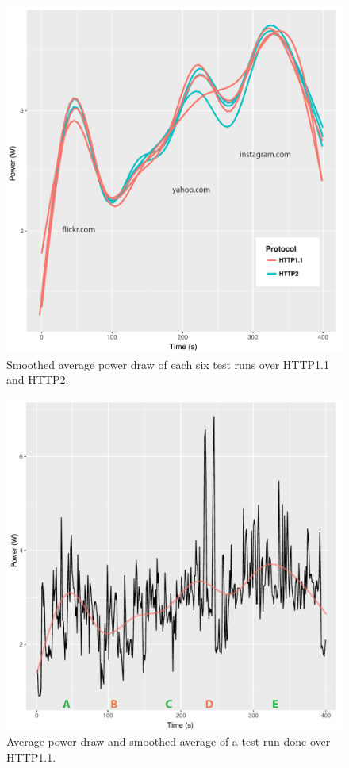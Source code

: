\documentclass{article}
\begin{document}
\begin{figure}[h!]
\centering
\includegraphics[scale=0.73]{images/smoothed_power}
\caption{Smoothed average power draw of each six test runs over HTTP1.1 and HTTP2.}
\label{fig:smoothed_power}
\end{figure}

\begin{figure}[t]
\centering
\includegraphics[scale=0.675]{images/average_power}
\caption{Average power draw and smoothed average of a test run done over HTTP1.1.}
\label{fig:average_power}
\end{figure}
\end{document}
